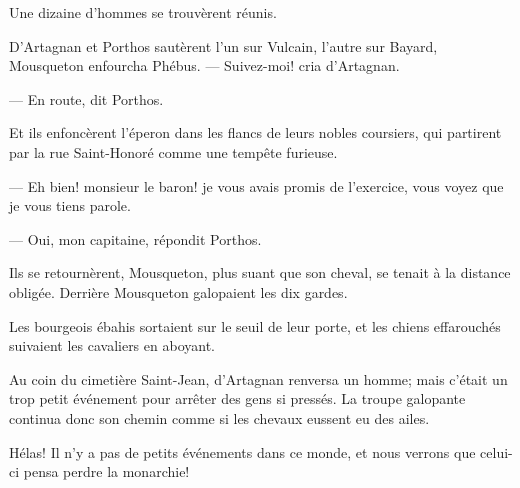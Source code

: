 Une dizaine d'hommes se trouvèrent réunis.

D'Artagnan et Porthos sautèrent l'un sur Vulcain, l'autre sur Bayard, Mousqueton enfourcha Phébus.
— Suivez-moi! cria d'Artagnan.

— En route, dit Porthos.

Et ils enfoncèrent l'éperon dans les flancs de leurs nobles coursiers, qui partirent par la rue Saint-Honoré comme une tempête furieuse.

— Eh bien! monsieur le baron! je vous avais promis de l'exercice, vous voyez que je vous tiens parole.

— Oui, mon capitaine, répondit Porthos.

Ils se retournèrent, Mousqueton, plus suant que son cheval, se tenait à la distance obligée. Derrière Mousqueton galopaient les dix gardes.

Les bourgeois ébahis sortaient sur le seuil de leur porte, et les chiens effarouchés suivaient les cavaliers en aboyant.

Au coin du cimetière Saint-Jean, d'Artagnan renversa un homme; mais c'était un trop petit événement pour arrêter des gens si pressés. La troupe galopante continua donc son chemin comme si les chevaux eussent eu des ailes.

Hélas! Il n'y a pas de petits événements dans ce monde, et nous verrons que celui-ci pensa perdre la monarchie!